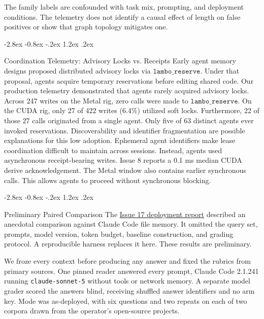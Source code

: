 \documentclass[10pt,twocolumn]{article}
\makeatletter
\renewcommand\subsection{\@startsection{subsection}{2}{\z@}%
  {-2.8ex \@plus -0.8ex \@minus -.2ex}%
  {1.2ex \@plus .2ex}%
  {\normalfont\normalsize\bfseries\raggedright}}
\makeatother
\begin{document}
The family labels are confounded with task mix, prompting, and deployment conditions. The telemetry does not identify a causal effect of length on false positives or show that graph topology mitigates one.

\subsection{Coordination Telemetry: Advisory Locks vs. Receipts}
Early agent memory designs proposed distributed advisory locks via $\mathtt{lambo\_reserve}$.
Under that proposal, agents acquire temporary reservations before editing shared code.
Our production telemetry demonstrated that agents rarely acquired advisory locks.
Across 247 writes on the Metal rig, zero calls were made to $\mathtt{lambo\_reserve}$.
On the CUDA rig, only 27 of 422 writes (6.4\%) utilized soft locks.
Furthermore, 22 of those 27 calls originated from a single agent.
Only five of 63 distinct agents ever invoked reservations.
Discoverability and identifier fragmentation are possible explanations for this low adoption.
Ephemeral agent identifiers make lease coordination difficult to maintain across sessions.
Instead, agents used asynchronous receipt-bearing writes.
Issue 8 reports a 0.1 ms median CUDA derive acknowledgement. The Metal window also contains earlier synchronous calls.
This allows agents to proceed without synchronous blocking.

\subsection{Preliminary Paired Comparison}
The \href{https://github.com/nrynss/lambo/issues/17}{Issue 17 deployment report} described an anecdotal comparison against Claude Code file memory.
It omitted the query set, prompts, model version, token budget, baseline construction, and grading protocol. A reproducible harness replaces it here. These results are preliminary.

We froze every context before producing any answer and fixed the rubrics from primary sources.
One pinned reader answered every prompt, Claude Code 2.1.241 running \texttt{claude-sonnet-5} without tools or network memory.
A separate model grader scored the answers blind, receiving shuffled answer identifiers and no arm key.
Mode was as-deployed, with six questions and two repeats on each of two corpora drawn from the operator's open-source projects.
\end{document}
